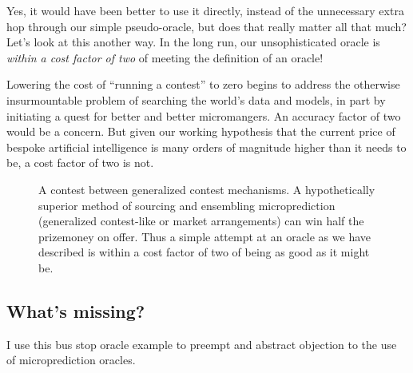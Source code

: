 Yes, it would have been better to use it directly, instead of the unnecessary extra hop through our simple pseudo-oracle, but does that really matter all that much?  Let's look at this another way. In the long run, our unsophisticated oracle is {\em within a cost factor of two} of meeting the definition of an oracle!  

Lowering the cost of ``running a contest'' to zero begins to address the otherwise insurmountable problem of searching the world's data and models, in part by initiating a quest for better and better micromangers. An accuracy factor of two would be a concern. But given our working hypothesis that the current price of bespoke artificial intelligence is many orders of magnitude higher than it needs to be, a cost factor of two is not. 



\begin{figure}[htp]
\centering
\iftikz 
{}
\else 
\fi 
\caption{A contest between generalized contest mechanisms. A hypothetically superior method of sourcing and ensembling microprediction (generalized contest-like or market arrangements) can win half the prizemoney on offer. Thus a simple attempt at an oracle as we have described is within a cost factor of two of being as good as it might be.}
\label{fig_m_3}
\end{figure}

\subsection{What's missing?}

I use this bus stop oracle example to preempt and abstract objection to the use of microprediction oracles. 

